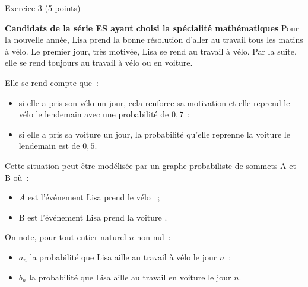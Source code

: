 
%
\begin{h2}Exercice 3 (5 points)\end{h2}
\textbf{Candidats de la série ES ayant choisi la spécialité \og mathématiques \fg{}}
\bigbreak
Pour la nouvelle année, Lisa prend la bonne résolution d'aller au travail tous les matins à
vélo. Le premier jour, très motivée, Lisa se rend au travail à vélo. Par la suite, elle se rend toujours au travail à vélo ou en voiture.
\par
Elle se rend compte que~:
\begin{indent}
     \begin{itemize}
          \item si elle a pris son vélo un jour, cela renforce sa motivation et elle reprend le vélo le lendemain avec une probabilité de $0,7$~;
          \item si elle a pris sa voiture un jour, la probabilité qu'elle reprenne la voiture le lendemain est de $0,5$.
     \end{itemize}
\end{indent}
Cette situation peut être modélisée par un graphe probabiliste de sommets A et B où~:
\begin{indent}
     \begin{itemize}
          \item $A$ est l'événement \og Lisa prend le vélo \fg{}~;
          \item B est l'événement \og Lisa prend la voiture \fg.
     \end{itemize}
\end{indent}
On note, pour tout entier naturel $n$ non nul~:
\begin{indent}
     \begin{itemize}
          \item $a_n$ la probabilité que Lisa aille au travail à vélo le jour $n$~;
          \item $b_n$ la probabilité que Lisa aille au travail en voiture le jour $n$.
     \end{itemize}
\end{indent}
\medbreak

